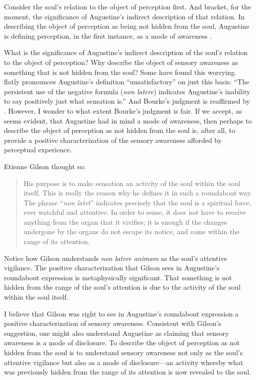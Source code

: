 \documentclass[12pt]{article}
\begin{document}
Consider the soul's relation to the object of perception first. And bracket, for the moment, the significance of Augustine's indirect description of that relation. In describing the object of perception as being not hidden from the soul, Augustine is defining perception, in the first instance, as a mode of awareness \citep[275]{Brittain:2002hl}. 

What is the significance of Augustine's indirect description of the soul's relation to the object of perception? Why describe the object of sensory awareness as something that is not hidden from the soul? Some have found this worrying. \citet[112]{Bourke:1947jk} flatly pronounces Augustine's definition ``unsatisfactory'' on just this basis: ``The persistent use of the negative formula (\emph{non latere}) indicates Augustine's inability to say positively just what sensation is.'' And Bourke's judgment is reaffirmed by \citet[104, n.1]{McMahon:1947dn}. However, I wonder to what extent Bourke's judgment is fair. If we accept, as seems evident, that Augustine had in mind a mode of awareness, then perhaps to describe the object of perception as not hidden from the soul is, after all, to provide a positive characterization of the sensory awareness afforded by perceptual experience.

Etienne Gilson thought so:
\begin{quote}
	His purpose is to make sensation an activity of the soul within the soul itself. This is really the reason why he defines it in such a roundabout way. The phrase ``\emph{non latet}'' indicates precisely that the soul is a spiritual force, ever watchful and attentive. In order to sense, it does not have to receive anything from the organ that it vivifies; it is enough if the changes undergone by the organs do not escape its notice, and come within the range of its attention. \citep[63]{Gilson:1961ec}
\end{quote}
Notice how Gilson understands \emph{non latere animam} as the soul's attentive vigilance. The positive characterization that Gilson sees in Augustine's roundabout expression is metaphysically significant. That something is not hidden from the range of the soul's attention is due to the activity of the soul within the soul itself.

I believe that Gilson was right to see in Augustine's roundabout expression a positive characterization of sensory awareness. Consistent with Gilson's suggestion, one might also understand Augustine as claiming that sensory awareness is a mode of disclosure. To describe the object of perception as not hidden from the soul is to understand sensory awareness not only as the soul's attentive vigilance but also as a mode of disclosure---an activity whereby what was previously hidden from the range of its attention is now revealed to the soul.
\end{document}
